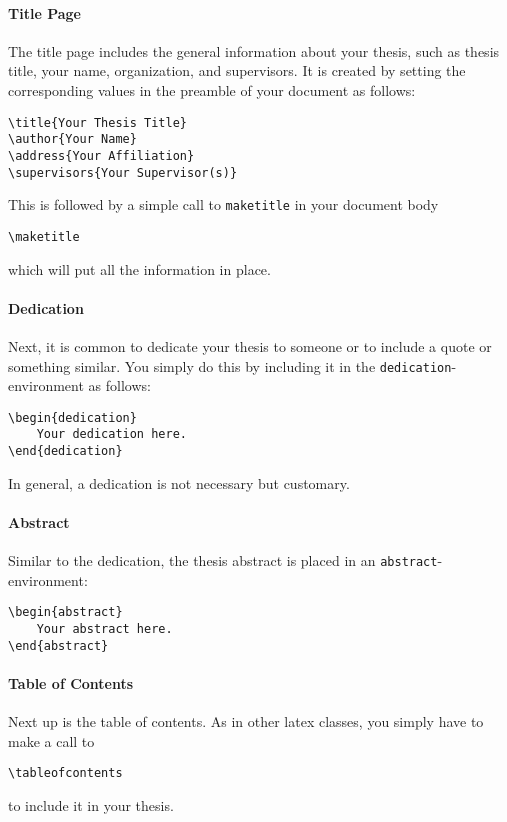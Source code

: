 \paragraph{Title Page} The title page includes the general information about your thesis, such as thesis title, your name, organization, and supervisors. It is created by setting the corresponding values in the preamble of your document as follows:
%
\begin{lstlisting}
\title{Your Thesis Title}
\author{Your Name}
\address{Your Affiliation}
\supervisors{Your Supervisor(s)}
\end{lstlisting}
%
This is followed by a simple call to \texttt{maketitle} in your document body
%
\begin{lstlisting}
\maketitle
\end{lstlisting}
%
which will put all the information in place.

\paragraph{Dedication} Next, it is common to dedicate your thesis to someone or to include a quote or something similar. You simply do this by including it in the \texttt{dedication}-environment as follows:
%
\begin{lstlisting}
\begin{dedication}
    Your dedication here.
\end{dedication}
\end{lstlisting}
%
In general, a dedication is not necessary but customary.

\paragraph{Abstract} Similar to the dedication, the thesis abstract is placed in an \texttt{abstract}-environment:
%
\begin{lstlisting}
\begin{abstract}
    Your abstract here.
\end{abstract}
\end{lstlisting}

\paragraph{Table of Contents} Next up is the table of contents. As in other latex classes, you simply have to make a call to
%
\begin{lstlisting}
\tableofcontents
\end{lstlisting}
%
to include it in your thesis.

